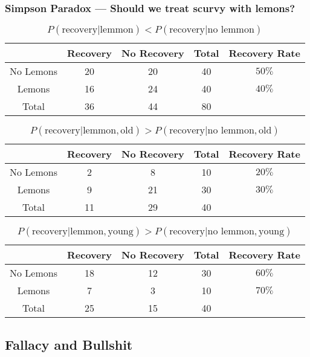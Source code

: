 \documentclass[UTF8,11pt,colorlinks,compress,openany]{beamer}%
\begin{document}
\begin{frame}\frametitle{Simpson Paradox --- Should we treat scurvy with lemons?}
\vspace*{-1ex}
\begin{table}
\begin{tabu}{c|cccc}
\hline
 & Recovery & No Recovery & Total & Recovery Rate\\
\hline
No Lemons & 20 & 20 & 40 & $50\%$ \\
Lemons & 16 & 24 & 40 & $40\%$ \\
Total & 36 & 44 & 80 &\\
\hline
\end{tabu}\caption{$P(\text{recovery}|\text{lemmon})<P(\text{recovery}|\text{no lemmon})$}
\end{table}
\begin{table}
\vspace*{-1ex}
\begin{tabu}{c|cccc}
\hline
 & Recovery & No Recovery & Total & Recovery Rate\\
\hline
No Lemons & 2 & 8 & 10 & $20\%$ \\
Lemons & 9 & 21 & 30 & $30\%$ \\
Total & 11 & 29 & 40 &\\
\hline
\end{tabu}\caption{$P(\text{recovery}|\text{lemmon},\text{old})>P(\text{recovery}|\text{no lemmon},\text{old})$}
\end{table}
\vspace*{-1ex}
\begin{table}
\begin{tabu}{c|cccc}
\hline
 & Recovery & No Recovery & Total & Recovery Rate\\
\hline
No Lemons & 18 & 12 & 30 & $60\%$ \\
Lemons & 7 & 3 & 10 & $70\%$ \\
Total & 25 & 15 & 40 &\\
\hline
\end{tabu}\caption{$P(\text{recovery}|\text{lemmon},\text{young})>P(\text{recovery}|\text{no lemmon},\text{young})$}
\end{table}
\end{frame}

\subsection{Fallacy and Bullshit}
\end{document}
